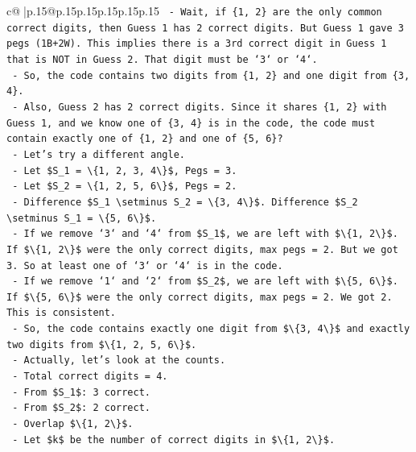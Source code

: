 \documentclass{article}
\begin{document}
{\begin{supertabular}{c@{$\;$}|p{.15\linewidth}@{}p{.15\linewidth}p{.15\linewidth}p{.15\linewidth}p{.15\linewidth}p{.15\linewidth}}
{{{\texttt{    {-} Wait, if \{1, 2\} are the only common correct digits, then Guess 1 has 2 correct digits. But Guess 1 gave 3 pegs (1B+2W). This implies there is a 3rd correct digit in Guess 1 that is NOT in Guess 2. That digit must be `3` or `4`.} \\
\texttt{    {-} So, the code contains two digits from \{1, 2\} and one digit from \{3, 4\}.} \\
\texttt{    {-} Also, Guess 2 has 2 correct digits. Since it shares \{1, 2\} with Guess 1, and we know one of \{3, 4\} is in the code, the code must contain exactly one of \{1, 2\} and one of \{5, 6\}?} \\
\texttt{    {-} Let's try a different angle.} \\
\texttt{    {-} Let \$S\_1 = \textbackslash{}\{1, 2, 3, 4\textbackslash{}\}\$, Pegs = 3.} \\
\texttt{    {-} Let \$S\_2 = \textbackslash{}\{1, 2, 5, 6\textbackslash{}\}\$, Pegs = 2.} \\
\texttt{    {-} Difference \$S\_1 \textbackslash{}setminus S\_2 = \textbackslash{}\{3, 4\textbackslash{}\}\$. Difference \$S\_2 \textbackslash{}setminus S\_1 = \textbackslash{}\{5, 6\textbackslash{}\}\$.} \\
\texttt{    {-} If we remove `3` and `4` from \$S\_1\$, we are left with \$\textbackslash{}\{1, 2\textbackslash{}\}\$. If \$\textbackslash{}\{1, 2\textbackslash{}\}\$ were the only correct digits, max pegs = 2. But we got 3. So at least one of `3` or `4` is in the code.} \\
\texttt{    {-} If we remove `1` and `2` from \$S\_2\$, we are left with \$\textbackslash{}\{5, 6\textbackslash{}\}\$. If \$\textbackslash{}\{5, 6\textbackslash{}\}\$ were the only correct digits, max pegs = 2. We got 2. This is consistent.} \\
\texttt{    {-} So, the code contains exactly one digit from \$\textbackslash{}\{3, 4\textbackslash{}\}\$ and exactly two digits from \$\textbackslash{}\{1, 2, 5, 6\textbackslash{}\}\$.} \\
\texttt{    {-} Actually, let's look at the counts.} \\
\texttt{    {-} Total correct digits = 4.} \\
\texttt{    {-} From \$S\_1\$: 3 correct.} \\
\texttt{    {-} From \$S\_2\$: 2 correct.} \\
\texttt{    {-} Overlap \$\textbackslash{}\{1, 2\textbackslash{}\}\$.} \\
\texttt{    {-} Let \$k\$ be the number of correct digits in \$\textbackslash{}\{1, 2\textbackslash{}\}\$.} \\
}}}
\end{supertabular}}
\end{document}
